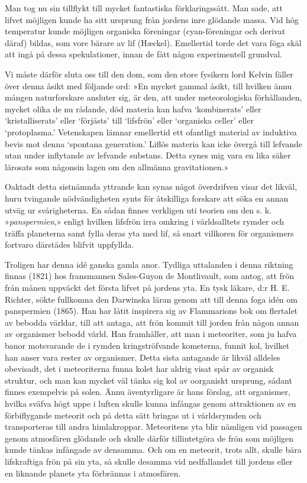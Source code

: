 \documentclass[a4paper, 12pt, oneside, swedish]{article}
\begin{document}
Man tog nu sin tillflykt till mycket fantastiska förklaringssätt. Man sade, att lifvet möjligen kunde ha sitt ursprung från jordens inre glödande massa. Vid hög temperatur kunde möjligen organiska föreningar (cyan-föreningar och derivat däraf) bildas, som vore bärare av lif (Hæckel). Emellertid torde det vara föga skäl att ingå på dessa spekulationer, innan de fått någon experimentell grundval.

Vi måste därför sluta oss till den dom, som den store fysikern lord Kelvin fäller över denna åsikt med följande ord: »En mycket gammal åsikt, till hvilken ännu mången naturforskare ansluter sig, är den, att under meteorologiska förhållanden, mycket olika de nu rådande, död materia kan hafva `kombinerats' eller `kristalliserats' eller `förjästs' till `lifsfrön' eller `organiska celler' eller `protoplasma.' Vetenskapen lämnar emellertid ett ofantligt material av induktiva bevis mot denna `spontana generation.' Liflös materia kan icke övergå till lefvande utan under inflytande av lefvande substans. Detta synes mig vara en lika säker lärosats som någonsin lagen om den allmänna gravitationen.»

Oaktadt detta sistnämnda yttrande kan synas något överdrifven visar det likväl, huru tvingande nödvändigheten synts för åtskilliga forskare att söka en annan utväg ur svårigheterna. En sådan finnes verkligen uti teorien om den s. k. »\emph{panspermien},» enligt hvilken lifsfrön irra omkring i världsalltets rymder och träffa planeterna samt fylla deras yta med lif, så snart villkoren för organismers fortvaro därstädes blifvit uppfyllda.

Troligen har denna idé ganska gamla anor. Tydliga uttalanden i denna riktning finnas (1821) hos fransmannen Sales-Guyon de Montlivault, som antog, att frön från månen uppväckt det första lifvet på jordens yta. En tysk läkare, d:r H. E. Richter, sökte fullkomna den Darwinska läran genom att till denna foga idén om panspermien (1865). Han har låtit inspirera sig av Flammarions bok om flertalet av bebodda världar, till att antaga, att frön kommit till jorden från någon annan av organismer bebodd värld. Han framhåller, att man i meteoriter, som ju hafva banor motsvarande de i rymden kringströfvande kometerna, funnit kol, hvilket han anser vara rester av organismer. Detta sista antagande är likväl alldeles obevisadt, det i meteoriterna funna kolet har aldrig visat spår av organisk struktur, och man kan mycket väl tänka sig kol av oorganiskt ursprung, sådant finnes exempelvis på solen. Ännu äventyrligare är hans förslag, att organismer, hvilka sväfva högt uppe i luften skulle kunna infångas genom attraktionen av en förbiflygande meteorit och på detta sätt bringas ut i världsrymden och transporteras till andra himlakroppar. Meteoritens yta blir nämligen vid passagen genom atmosfären glödande och skulle därför tillintetgöra de frön som möjligen kunde tänkas infångade av densamma. Och om en meteorit, trots allt, skulle bära lifskraftiga frön på sin yta, så skulle desamma vid nedfallandet till jordens eller en liknande planets yta förbrännas i atmosfären.
\end{document}
